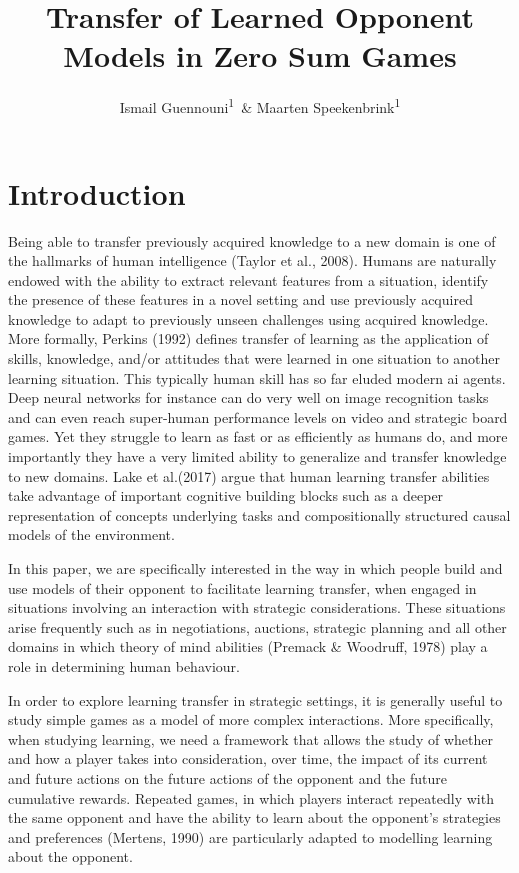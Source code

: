 \documentclass[,man,floatsintext]{apa6}
\affiliation{
\vspace{0.5cm}
\textsuperscript{1} Department of Experimental Psychology, University College London}
\title{Transfer of Learned Opponent Models in Zero Sum Games}
\author{Ismail Guennouni\textsuperscript{1}~\& Maarten Speekenbrink\textsuperscript{1}}
\date{}
\begin{document}
\maketitle

\hypertarget{introduction}{%
\section{Introduction}\label{introduction}}

Being able to transfer previously acquired knowledge to a new domain is one of the hallmarks of human intelligence (Taylor et al., 2008). Humans are naturally endowed with the ability to extract relevant features from a situation, identify the presence of these features in a novel setting and use previously acquired knowledge to adapt to previously unseen challenges using acquired knowledge. More formally, Perkins (1992) defines transfer of learning as the application of skills, knowledge, and/or attitudes that were learned in one situation to another learning situation. This typically human skill has so far eluded modern ai agents. Deep neural networks for instance can do very well on image recognition tasks and can even reach super-human performance levels on video and strategic board games. Yet they struggle to learn as fast or as efficiently as humans do, and more importantly they have a very limited ability to generalize and transfer knowledge to new domains. Lake et al.(2017) argue that human learning transfer abilities take advantage of important cognitive building blocks such as a deeper representation of concepts underlying tasks and compositionally structured causal models of the environment.

In this paper, we are specifically interested in the way in which people build and use models of their opponent to facilitate learning transfer, when engaged in situations involving an interaction with strategic considerations. These situations arise frequently such as in negotiations, auctions, strategic planning and all other domains in which theory of mind abilities (Premack \& Woodruff, 1978) play a role in determining human behaviour.

In order to explore learning transfer in strategic settings, it is generally useful to study simple games as a model of more complex interactions. More specifically, when studying learning, we need a framework that allows the study of whether and how a player takes into consideration, over time, the impact of its current and future actions on the future actions of the opponent and the future cumulative rewards. Repeated games, in which players interact repeatedly with the same opponent and have the ability to learn about the opponent's strategies and preferences (Mertens, 1990) are particularly adapted to modelling learning about the opponent.
\end{document}
